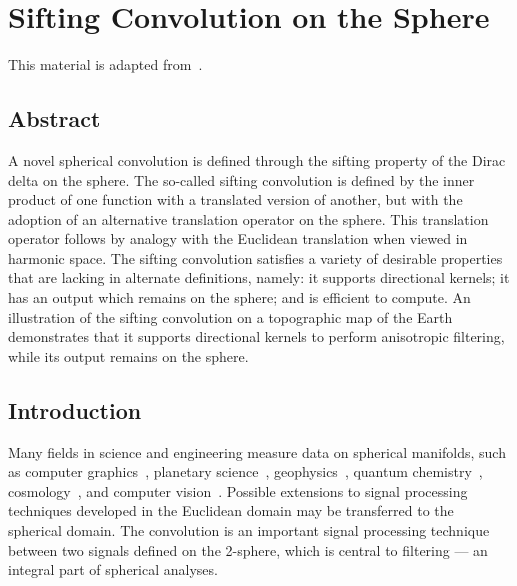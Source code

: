 \chapter{Sifting Convolution on the Sphere}\label{sec:chapter2}

This material is adapted from~\cite{Roddy2021}.

\section*{Abstract}

A novel spherical convolution is defined through the sifting property of the Dirac delta on the sphere.
The so-called sifting convolution is defined by the inner product of one function with a translated version of another, but with the adoption of an alternative translation operator on the sphere.
This translation operator follows by analogy with the Euclidean translation when viewed in harmonic space.
The sifting convolution satisfies a variety of desirable properties that are lacking in alternate definitions, namely: it supports directional kernels; it has an output which remains on the sphere; and is efficient to compute.
An illustration of the sifting convolution on a topographic map of the Earth demonstrates that it supports directional kernels to perform anisotropic filtering, while its output remains on the sphere.

\section{Introduction}

Many fields in science and engineering measure data on spherical manifolds, such as computer graphics~\cite{Ramamoorthi2004}, planetary science~\cite{Turcotte1981}, geophysics~\cite{Simons2006}, quantum chemistry~\cite{Choi1999}, cosmology~\cite{Bennett1996}, and computer vision~\cite{Cohen2018,Esteves2020,Cobb2021}.
Possible extensions to signal processing techniques developed in the Euclidean domain may be transferred to the spherical domain.
The convolution is an important signal processing technique between two signals defined on the 2-sphere, which is central to filtering --- an integral part of spherical analyses.

